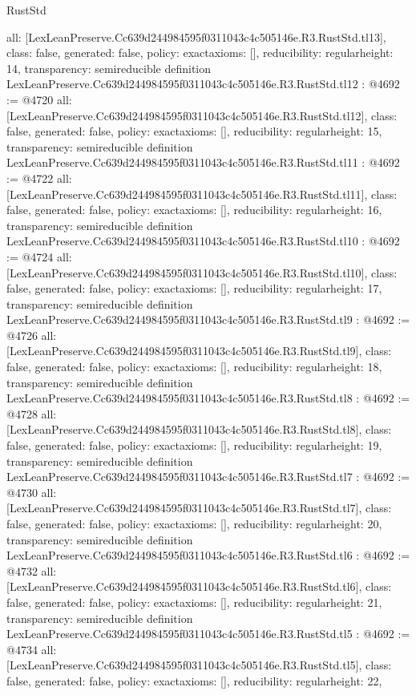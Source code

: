 \begin{lexlean}{RustStd}
\begin{coremodule}
{  all: [LexLeanPreserve.Cc639d244984595f0311043c4c505146e.R3.RustStd.tl13],
  class: false,
  generated: false,
  policy: exact{axioms: []},
  reducibility: regular{height: 14},
  transparency: semireducible
}
definition LexLeanPreserve.Cc639d244984595f0311043c4c505146e.R3.RustStd.tl12 : @4692 := @4720 {
  all: [LexLeanPreserve.Cc639d244984595f0311043c4c505146e.R3.RustStd.tl12],
  class: false,
  generated: false,
  policy: exact{axioms: []},
  reducibility: regular{height: 15},
  transparency: semireducible
}
definition LexLeanPreserve.Cc639d244984595f0311043c4c505146e.R3.RustStd.tl11 : @4692 := @4722 {
  all: [LexLeanPreserve.Cc639d244984595f0311043c4c505146e.R3.RustStd.tl11],
  class: false,
  generated: false,
  policy: exact{axioms: []},
  reducibility: regular{height: 16},
  transparency: semireducible
}
definition LexLeanPreserve.Cc639d244984595f0311043c4c505146e.R3.RustStd.tl10 : @4692 := @4724 {
  all: [LexLeanPreserve.Cc639d244984595f0311043c4c505146e.R3.RustStd.tl10],
  class: false,
  generated: false,
  policy: exact{axioms: []},
  reducibility: regular{height: 17},
  transparency: semireducible
}
definition LexLeanPreserve.Cc639d244984595f0311043c4c505146e.R3.RustStd.tl9 : @4692 := @4726 {
  all: [LexLeanPreserve.Cc639d244984595f0311043c4c505146e.R3.RustStd.tl9],
  class: false,
  generated: false,
  policy: exact{axioms: []},
  reducibility: regular{height: 18},
  transparency: semireducible
}
definition LexLeanPreserve.Cc639d244984595f0311043c4c505146e.R3.RustStd.tl8 : @4692 := @4728 {
  all: [LexLeanPreserve.Cc639d244984595f0311043c4c505146e.R3.RustStd.tl8],
  class: false,
  generated: false,
  policy: exact{axioms: []},
  reducibility: regular{height: 19},
  transparency: semireducible
}
definition LexLeanPreserve.Cc639d244984595f0311043c4c505146e.R3.RustStd.tl7 : @4692 := @4730 {
  all: [LexLeanPreserve.Cc639d244984595f0311043c4c505146e.R3.RustStd.tl7],
  class: false,
  generated: false,
  policy: exact{axioms: []},
  reducibility: regular{height: 20},
  transparency: semireducible
}
definition LexLeanPreserve.Cc639d244984595f0311043c4c505146e.R3.RustStd.tl6 : @4692 := @4732 {
  all: [LexLeanPreserve.Cc639d244984595f0311043c4c505146e.R3.RustStd.tl6],
  class: false,
  generated: false,
  policy: exact{axioms: []},
  reducibility: regular{height: 21},
  transparency: semireducible
}
definition LexLeanPreserve.Cc639d244984595f0311043c4c505146e.R3.RustStd.tl5 : @4692 := @4734 {
  all: [LexLeanPreserve.Cc639d244984595f0311043c4c505146e.R3.RustStd.tl5],
  class: false,
  generated: false,
  policy: exact{axioms: []},
  reducibility: regular{height: 22},
}
\end{coremodule}
\end{lexlean}

